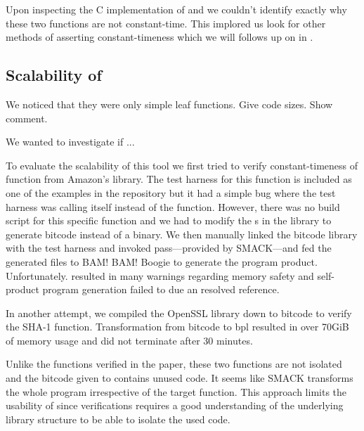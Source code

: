 Upon inspecting the C implementation of  and 
we couldn't identify exactly why these two functions are not constant-time.
This implored us look for other methods of asserting constant-timeness which
we will follows up on in .



\subsection{Scalability of \ctVerif}

We noticed that they were only simple leaf functions.
Give code sizes.
Show comment.

We wanted to investigate if ... 

To evaluate the scalability of this tool we first tried to verify
constant-timeness of function  from Amazon's
 library. The test harness for this function is included as one of the
examples in the \ctVerif repository but it had a simple bug where the test
harness was calling itself instead of the  function.
However, there was no build script for this specific function and we had to modify the
s in the  library to generate
 bitcode instead of a binary. We then manually linked the bitcode
library with the test harness and invoked  pass---provided by
SMACK---and fed the generated  files to BAM! BAM! Boogie to
generate the program product. Unfortunately.  resulted in
many warnings regarding memory safety and self-product program generation failed
to due an resolved reference.

In another attempt, we compiled the OpenSSL library down to 
bitcode to verify the SHA-1 function. Transformation from bitcode to bpl
resulted in over 70GiB of memory usage and did not terminate after 30 minutes.

Unlike the functions verified in the paper, these two functions are not
isolated and the bitcode given to \ctVerif contains unused code. It seems like
SMACK transforms the whole program irrespective of the target function. This
approach limits the usability of \ctVerif since verifications requires a good
understanding of the underlying library structure to be able to isolate the used
code.